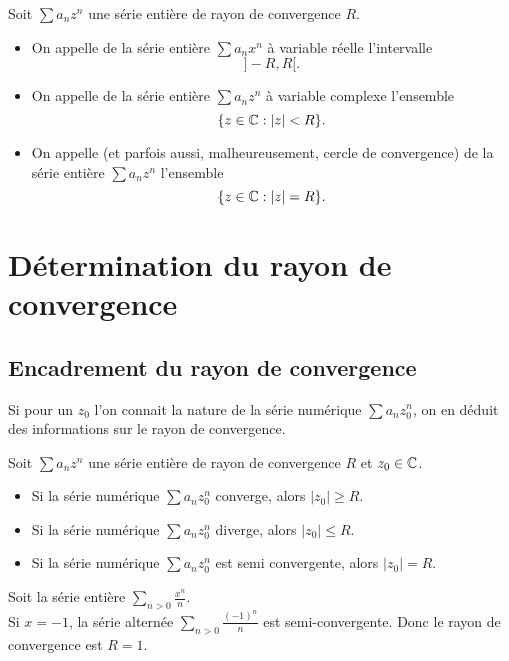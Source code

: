 \documentclass{book}
\begin{document}
\begin{Definition}
Soit $\sum a_n z^n$ une série entière de rayon de convergence $R$.
\begin{itemize}
\item
  On appelle  de la série entière $\sum a_n x^n $ à variable réelle l'intervalle
  \[ ]-R,R[. \]
\item
  On appelle  de la série entière $\sum a_n z^n$ à variable complexe l'ensemble
  \[ \{z\in \mathbb{C} :|z|<R\}. \]
\item
  On appelle 
  (et parfois aussi, malheureusement, cercle de convergence)
  de la série entière $\sum a_n z^n$ l'ensemble
  \[ \{z\in \mathbb{C}:|z|=R\}. \]
\end{itemize}
\end{Definition}


\section{Détermination du rayon de convergence}

\subsection{Encadrement du rayon de convergence}
Si pour un $z_0$ l'on connait la nature de la série numérique $\sum a_n z_0^n$, on en déduit des informations sur le rayon de convergence.
\begin{Proposition}
Soit $\sum a_n z^n$ une série entière de rayon de convergence $R$ et $z_0 \in \mathbb{C}$.
\begin{itemize}
\item Si la série numérique $\sum a_n z_0^n$ converge, alors $|z_0|\geq  R$.
\item  Si la série numérique $\sum a_n z_0^n$ diverge, alors $|z_0|\leq  R$.
\item  Si la série numérique $\sum a_n z_0^n$ est semi convergente, alors $|z_0|=  R$.
\end{itemize}
\end{Proposition}
\begin{Exemple}
Soit la série entière $\sum_{n>0}\frac{x^n}{n}$.\\
 Si $x=-1$, la série alternée $\sum_{n>0}\frac{(-1)^n}{n}$ est semi-convergente. Donc le rayon de convergence est $R=1$.
\end{Exemple}
\end{document}
